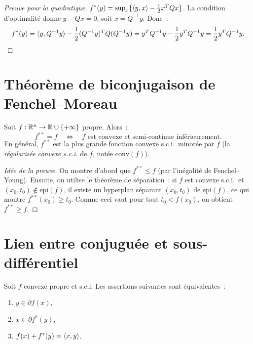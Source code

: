 \begin{proof}[Preuve pour la quadratique]
$f^*(y) = \sup_x \{\langle y, x \rangle - \frac{1}{2}x^TQx\}$. La condition d'optimalit\'e
donne $y - Qx = 0$, soit $x = Q^{-1}y$. Donc~:
\[
    f^*(y) = \langle y, Q^{-1}y \rangle - \frac{1}{2}(Q^{-1}y)^TQ(Q^{-1}y)
    = y^TQ^{-1}y - \frac{1}{2}y^TQ^{-1}y = \frac{1}{2}y^TQ^{-1}y.
\]
\end{proof}

\section{Th\'eor\`eme de biconjugaison de Fenchel--Moreau}

\begin{theoreme}
\label{thm:fenchel_moreau}
Soit $f : \mathbb{R}^n \to \mathbb{R} \cup \{+\infty\}$ propre. Alors~:
\[
    f^{**} = f \quad \Longleftrightarrow \quad
    f \text{ est convexe et semi-continue inf\'erieurement.}
\]
En g\'en\'eral, $f^{**}$ est la plus grande fonction convexe s.c.i.\ minor\'ee par $f$
(la \emph{r\'egularis\'ee convexe s.c.i.} de $f$, not\'ee $\overline{\mathrm{conv}}(f)$).
\end{theoreme}

\begin{proof}[Id\'ee de la preuve]
On montre d'abord que $f^{**} \leq f$ (par l'in\'egalit\'e de Fenchel--Young).
Ensuite, on utilise le th\'eor\`eme de s\'eparation~: si $f$ est convexe s.c.i.\
et $(x_0, t_0) \notin \mathrm{epi}(f)$, il existe un hyperplan s\'eparant
$(x_0, t_0)$ de $\mathrm{epi}(f)$, ce qui montre $f^{**}(x_0) \geq t_0$.
Comme ceci vaut pour tout $t_0 < f(x_0)$, on obtient $f^{**} \geq f$.
\end{proof}

\section{Lien entre conjugu\'ee et sous-diff\'erentiel}

\begin{theoreme}
\label{thm:conjuguee_subdiff}
Soit $f$ convexe propre et s.c.i. Les assertions suivantes sont \'equivalentes~:
\begin{enumerate}
    \item $y \in \partial f(x)$,
    \item $x \in \partial f^*(y)$,
    \item $f(x) + f^*(y) = \langle x, y \rangle$.
\end{enumerate}
\end{theoreme}

